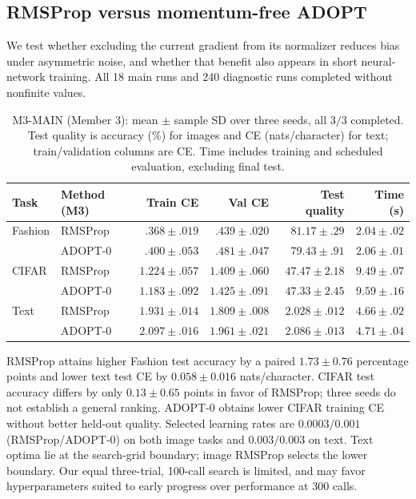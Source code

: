 \subsection{RMSProp versus momentum-free ADOPT}\label{sec:results-m3}
We test whether excluding the current gradient from its normalizer reduces bias under
asymmetric noise, and whether that benefit also appears in short neural-network training.
All 18 main runs and 240 diagnostic runs completed without nonfinite values.

\begin{table}[H]\centering\small
\caption{M3-MAIN (Member 3): mean $\pm$ sample SD over three seeds, all $3/3$ completed.
Test quality is accuracy (\%) for images and CE (nats/character) for text; train/validation
columns are CE. Time includes training and scheduled evaluation, excluding final test.}
\label{tab:m3-main}
\begin{tabular}{llrrrr}\toprule
Task & Method (M3) & Train CE & Val CE & Test quality & Time (s)\\\midrule
Fashion & RMSProp & $.368\pm.019$ & $.439\pm.020$ & $81.17\pm.29$ & $2.04\pm.02$\\
 & ADOPT-0 & $.400\pm.053$ & $.481\pm.047$ & $79.43\pm.91$ & $2.06\pm.01$\\
CIFAR & RMSProp & $1.224\pm.057$ & $1.409\pm.060$ & $47.47\pm2.18$ & $9.49\pm.07$\\
 & ADOPT-0 & $1.183\pm.092$ & $1.425\pm.091$ & $47.33\pm2.45$ & $9.59\pm.16$\\
Text & RMSProp & $1.931\pm.014$ & $1.809\pm.008$ & $2.028\pm.012$ & $4.66\pm.02$\\
 & ADOPT-0 & $2.097\pm.016$ & $1.961\pm.021$ & $2.086\pm.013$ & $4.71\pm.04$\\
\bottomrule\end{tabular}\end{table}

RMSProp attains higher Fashion test accuracy by a paired $1.73\pm0.76$ percentage points
and lower text test CE by $0.058\pm0.016$ nats/character. CIFAR test accuracy differs by only
$0.13\pm0.65$ points in favor of RMSProp; three seeds do not establish a general ranking.
ADOPT-0 obtains lower CIFAR training CE without better held-out quality.
Selected learning rates are $0.0003/0.001$ (RMSProp/ADOPT-0) on both image tasks and
$0.003/0.003$ on text. Text optima lie at the search-grid boundary; image RMSProp selects
the lower boundary. Our equal three-trial, 100-call search is limited, and may favor
hyperparameters suited to early progress over performance at 300 calls.

